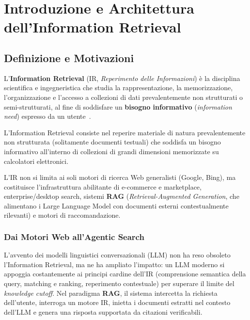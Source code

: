 \chapter{Introduzione e Architettura dell'Information Retrieval}
\label{chap:introduzione-architettura-ir}

\FloatBarrier
\section{Definizione e Motivazioni}
\label{sec:definizione-motivazioni-ir}

L'\textbf{Information Retrieval} (IR, \textit{Reperimento delle Informazioni}) \`e la disciplina scientifica e ingegneristica che studia la rappresentazione, la memorizzazione, l'organizzazione e l'accesso a collezioni di dati prevalentemente non strutturati o semi-strutturati, al fine di soddisfare un \textbf{bisogno informativo} (\textit{information need}) espresso da un utente~\cite{manning2008,buttcher2010}.

\begin{definition}
L'Information Retrieval consiste nel reperire materiale di natura prevalentemente non strutturata (solitamente documenti testuali) che soddisfa un bisogno informativo all'interno di collezioni di grandi dimensioni memorizzate su calcolatori elettronici.
\end{definition}

L'IR non si limita ai soli motori di ricerca Web generalisti (Google, Bing), ma costituisce l'infrastruttura abilitante di e-commerce e marketplace, enterprise/desktop search, sistemi \textbf{RAG} (\textit{Retrieval-Augmented Generation}, che alimentano i Large Language Model con documenti esterni contestualmente rilevanti) e motori di raccomandazione.

\subsection{Dai Motori Web all'Agentic Search}

L'avvento dei modelli linguistici conversazionali (LLM) non ha reso obsoleto l'Information Retrieval, ma ne ha ampliato l'impatto: un LLM moderno si appoggia costantemente ai principi cardine dell'IR (comprensione semantica della query, matching e ranking, reperimento contestuale) per superare il limite del \textit{knowledge cutoff}. Nel paradigma \textbf{RAG}, il sistema intercetta la richiesta dell'utente, interroga un motore IR, inietta i documenti estratti nel contesto dell'LLM e genera una risposta supportata da citazioni verificabili.


